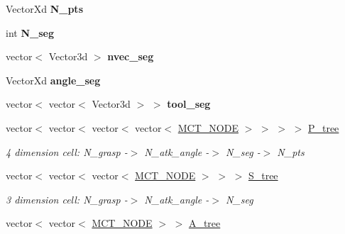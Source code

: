 \begin{DoxyCompactItemize}
\mbox{\label{classMCT__Search_ab7180423f851ac9639f15e892ebea136}} 
Vector\+Xd {\bfseries N\+\_\+pts}
\item 
\mbox{\label{classMCT__Search_a1aed3b79d71a636d0854fe7102fe0a35}} 
int {\bfseries N\+\_\+seg}
\item 
\mbox{\label{classMCT__Search_aac7911367edc23d88eeff1112f244bf2}} 
vector$<$ Vector3d $>$ {\bfseries nvec\+\_\+seg}
\item 
\mbox{\label{classMCT__Search_ad4e3a1cfc40736453201e2d89c787a63}} 
Vector\+Xd {\bfseries angle\+\_\+seg}
\item 
\mbox{\label{classMCT__Search_ab5cc950669617dd99b46079c0f88cebf}} 
vector$<$ vector$<$ Vector3d $>$ $>$ {\bfseries tool\+\_\+seg}
\item 
\mbox{\label{classMCT__Search_a0b10545d6a741ad56139867f3309e406}} 
vector$<$ vector$<$ vector$<$ vector$<$ \hyperlink{classMCT__NODE}{M\+C\+T\+\_\+\+N\+O\+DE} $>$ $>$ $>$ $>$ \hyperlink{classMCT__Search_a0b10545d6a741ad56139867f3309e406}{P\+\_\+tree}
\begin{DoxyCompactList}\small\item\em 4 dimension cell\+: N\+\_\+grasp -\/$>$ N\+\_\+atk\+\_\+angle -\/$>$ N\+\_\+seg -\/$>$ N\+\_\+pts \end{DoxyCompactList}\item 
\mbox{\label{classMCT__Search_a1ca45391df5ce89cf3395b589bf67ba3}} 
vector$<$ vector$<$ vector$<$ \hyperlink{classMCT__NODE}{M\+C\+T\+\_\+\+N\+O\+DE} $>$ $>$ $>$ \hyperlink{classMCT__Search_a1ca45391df5ce89cf3395b589bf67ba3}{S\+\_\+tree}
\begin{DoxyCompactList}\small\item\em 3 dimension cell\+: N\+\_\+grasp -\/$>$ N\+\_\+atk\+\_\+angle -\/$>$ N\+\_\+seg \end{DoxyCompactList}\item 
\mbox{\label{classMCT__Search_aa074a4409f6a8f1b1cc83ab79e4bfbfd}} 
vector$<$ vector$<$ \hyperlink{classMCT__NODE}{M\+C\+T\+\_\+\+N\+O\+DE} $>$ $>$ \hyperlink{classMCT__Search_aa074a4409f6a8f1b1cc83ab79e4bfbfd}{A\+\_\+tree}

\end{DoxyCompactItemize}
